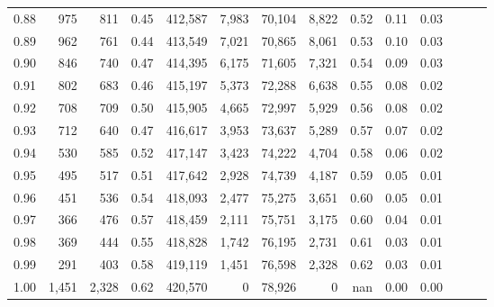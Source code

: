 \begin{tabular}{rrrrrrrrrrrrrr}
0.88 &     975 &    811 &  0.45 &  412,587 &    7,983 &  70,104 &   8,822 &  0.52 &  0.11 &      0.03 \\
0.89 &     962 &    761 &  0.44 &  413,549 &    7,021 &  70,865 &   8,061 &  0.53 &  0.10 &      0.03 \\
0.90 &     846 &    740 &  0.47 &  414,395 &    6,175 &  71,605 &   7,321 &  0.54 &  0.09 &      0.03 \\
0.91 &     802 &    683 &  0.46 &  415,197 &    5,373 &  72,288 &   6,638 &  0.55 &  0.08 &      0.02 \\
0.92 &     708 &    709 &  0.50 &  415,905 &    4,665 &  72,997 &   5,929 &  0.56 &  0.08 &      0.02 \\
0.93 &     712 &    640 &  0.47 &  416,617 &    3,953 &  73,637 &   5,289 &  0.57 &  0.07 &      0.02 \\
0.94 &     530 &    585 &  0.52 &  417,147 &    3,423 &  74,222 &   4,704 &  0.58 &  0.06 &      0.02 \\
0.95 &     495 &    517 &  0.51 &  417,642 &    2,928 &  74,739 &   4,187 &  0.59 &  0.05 &      0.01 \\
0.96 &     451 &    536 &  0.54 &  418,093 &    2,477 &  75,275 &   3,651 &  0.60 &  0.05 &      0.01 \\
0.97 &     366 &    476 &  0.57 &  418,459 &    2,111 &  75,751 &   3,175 &  0.60 &  0.04 &      0.01 \\
0.98 &     369 &    444 &  0.55 &  418,828 &    1,742 &  76,195 &   2,731 &  0.61 &  0.03 &      0.01 \\
0.99 &     291 &    403 &  0.58 &  419,119 &    1,451 &  76,598 &   2,328 &  0.62 &  0.03 &      0.01 \\
1.00 &   1,451 &  2,328 &  0.62 &  420,570 &        0 &  78,926 &       0 &   nan &  0.00 &      0.00 \\
\bottomrule
\end{tabular}
